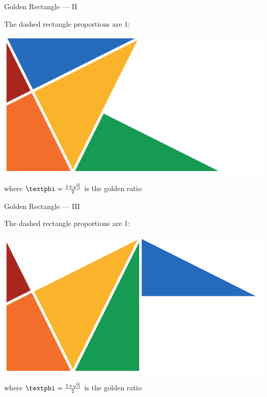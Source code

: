 \documentclass[14pt]{beamer}
\begin{document}
    \begin{frame}{Golden Rectangle --- II}
        \begin{center}
            The dashed rectangle proportions are 1:\textphi
        \end{center}
        \hspace{4.1em} \includegraphics[scale=1.0]{figures/figure030e.pdf} \\
        \begin{center}
            where $\text{\textphi} =\tfrac{1+\sqrt{5}}{2}$ is the golden ratio
        \end{center}
    \end{frame}


    \begin{frame}{Golden Rectangle --- III}
        \begin{center}
            The dashed rectangle proportions are 1:\textphi
        \end{center}
        \hspace{4.1em} \includegraphics[scale=1.0]{figures/figure030f.pdf} \\
        \begin{center}
            where $\text{\textphi} =\tfrac{1+\sqrt{5}}{2}$ is the golden ratio
        \end{center}
    \end{frame}
\end{document}
